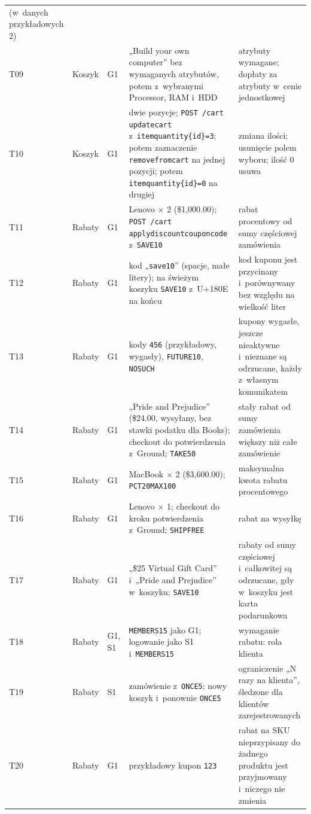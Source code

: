 {\begin{xltabular}{\linewidth}{@{}l >{\raggedright\arraybackslash}p{1.35cm} l >{\raggedright\arraybackslash}X >{\raggedright\arraybackslash}X@{}}
  (w~danych przykładowych 2) \\
T09 & Koszyk & G1 & „Build your own computer” bez wymaganych atrybutów, potem
  z~wybranymi Processor, RAM i~HDD & atrybuty wymagane; dopłaty za atrybuty w~cenie
  jednostkowej \\
T10 & Koszyk & G1 & dwie pozycje; \texttt{POST /cart} \texttt{updatecart}
  z~\texttt{itemquantity\{id\}=3}; potem zaznaczenie \texttt{removefromcart} na jednej
  pozycji; potem \texttt{itemquantity\{id\}=0} na drugiej & zmiana ilości; usunięcie
  polem wyboru; ilość 0 usuwa \\
T11 & Rabaty & G1 & Lenovo × 2 (\$1,000.00); \texttt{POST /cart}
  \texttt{applydiscountcouponcode} z~\texttt{SAVE10} & rabat procentowy od sumy
  częściowej zamówienia \\
T12 & Rabaty & G1 & kod „\texttt{\textvisiblespace{}save10\textvisiblespace{}}” (spacje, małe litery); na świeżym koszyku
  \texttt{SAVE10} z~U+180E na końcu & kod kuponu jest przycinany i~porównywany bez względu
  na wielkość liter \\
T13 & Rabaty & G1 & kody \texttt{456} (przykładowy, wygasły), \texttt{FUTURE10},
  \texttt{NOSUCH} & kupony wygasłe, jeszcze nieaktywne i~nieznane są odrzucane, każdy
  z~własnym komunikatem \\
T14 & Rabaty & G1 & „Pride and Prejudice” (\$24.00, wysyłany, bez stawki podatku dla
  Books); checkout do potwierdzenia z~Ground; \texttt{TAKE50} & stały rabat od sumy
  zamówienia większy niż całe zamówienie \\
T15 & Rabaty & G1 & MacBook × 2 (\$3,600.00); \texttt{PCT20MAX100} & maksymalna kwota
  rabatu procentowego \\
T16 & Rabaty & G1 & Lenovo × 1; checkout do kroku potwierdzenia z~Ground;
  \texttt{SHIPFREE} & rabat na wysyłkę \\
T17 & Rabaty & G1 & „\$25 Virtual Gift Card” i~„Pride and Prejudice” w~koszyku;
  \texttt{SAVE10} & rabaty od sumy częściowej i~całkowitej są odrzucane, gdy w~koszyku
  jest karta podarunkowa \\
T18 & Rabaty & G1, S1 & \texttt{MEMBERS15} jako G1; logowanie jako S1
  i~\texttt{MEMBERS15} & wymaganie rabatu: rola klienta \\
T19 & Rabaty & S1 & zamówienie z~\texttt{ONCE5}; nowy koszyk i~ponownie \texttt{ONCE5} &
  ograniczenie „N razy na klienta”, śledzone dla klientów zarejestrowanych \\
T20 & Rabaty & G1 & przykładowy kupon \texttt{123} & rabat na SKU nieprzypisany do żadnego
  produktu jest przyjmowany i~niczego nie zmienia \\

\end{xltabular}}
